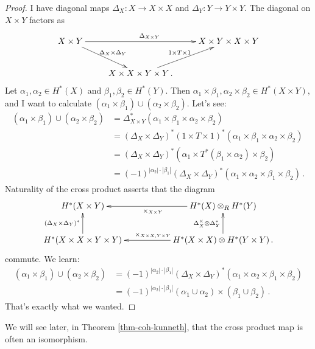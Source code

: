 \begin{proof}
I have diagonal maps $\Delta_X:X\to X\times X$ and $\Delta_Y:Y\to Y\times Y$. 
The diagonal on $X\times Y$ factors as
\[
\xymatrix{
X\times Y \ar[rr]^{\Delta_{X\times Y}} \ar[dr]^{\Delta_X\times\Delta_Y} &&
X\times Y\times X\times Y \\
& X\times X\times Y\times Y \ar[ur]^{1\times T\times1}\,.
}\]
Let $\alpha_1,\alpha_2\in H^\ast(X)$ and $\beta_1,\beta_2\in H^\ast(Y)$. Then $\alpha_1\times \beta_1,\alpha_2\times\beta_2\in H^\ast(X\times Y)$, and I want to calculate $(\alpha_1\times\beta_1)\cup(\alpha_2\times\beta_2)$. Let's see:
\begin{align*}
(\alpha_1\times\beta_1)\cup(\alpha_2\times\beta_2) & = \Delta_{X\times Y}^\ast(\alpha_1\times\beta_1\times\alpha_2\times\beta_2)\\
& = (\Delta_X\times\Delta_Y)^\ast(1\times T\times 1)^\ast(\alpha_1\times\beta_1\times\alpha_2\times\beta_2)\\
& = (\Delta_X\times\Delta_Y)^\ast(\alpha_1\times T^\ast(\beta_1\times\alpha_2)\times\beta_2)\\
& = (-1)^{|\alpha_2|\cdot|\beta_1|}(\Delta_X\times\Delta_Y)^\ast(\alpha_1\times\alpha_2\times\beta_1\times\beta_2)\,.
\end{align*}
Naturality of the cross product asserts that the diagram
\begin{equation*}
\xymatrix{
	 H^\ast(X\times Y) && \ar[ll]^{\times_{X\times Y}} H^\ast(X)\otimes_R H^\ast(Y)\\
	 H^\ast(X\times X\times Y\times Y)\ar[u]^{(\Delta_X\times\Delta_Y)^\ast} && H^\ast(X\times X)\otimes H^\ast(Y\times Y)\ar[ll]_{\times_{X\times X,Y\times Y}}\ar[u]^{\Delta_X^\times\otimes\Delta_Y^\ast}\,.
}
\end{equation*}
commute. We learn:
\begin{align*}
(\alpha_1\times\beta_1)\cup(\alpha_2\times\beta_2) & = (-1)^{|\alpha_2|\cdot|\beta_1|}(\Delta_X\times\Delta_Y)^\ast(\alpha_1\times\alpha_2\times\beta_1\times\beta_2)\\
& = (-1)^{|\alpha_2|\cdot|\beta_1|}(\alpha_1\cup\alpha_2)\times(\beta_1\cup\beta_2)\,.
\end{align*}
That's exactly what we wanted.
\end{proof}
We will see later, in Theorem \ref{thm-coh-kunneth}, that the cross product
map is often an isomorphism. 

